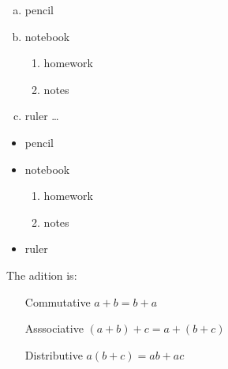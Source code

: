 \documentclass[11pt,a4paper]{article}
\begin{document}
\begin{enumerate}[(a)]
  \item pencil
  \item notebook
    \begin{enumerate}
      \item homework
      \item notes
    \end{enumerate}
  \item ruler \ldots
\end{enumerate}

\begin{itemize}
  \item pencil
  \item notebook
    \begin{enumerate}
      \item homework
      \item notes
    \end{enumerate}
  \item ruler
\end{itemize}

The adition is:

\begin{enumerate}
\item[Commutative] $a+b=b+a$
\item[Asssociative] $(a+b)+c=a+(b+c)$
\item[Distributive] $a(b+c)=ab+ac$
\end{enumerate}
\end{document}
